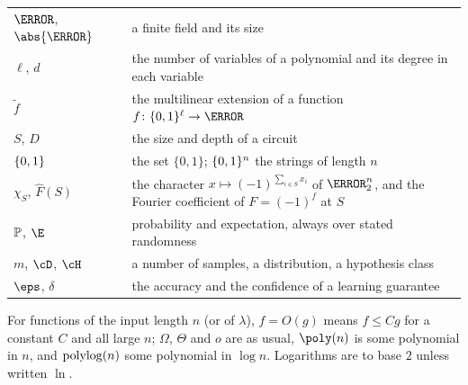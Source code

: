 \begin{tabular}{@{}p{}p{}@{}}
$\F$, $\abs{\F}$ & a finite field and its size \\
$\ell$, $d$ & the number of variables of a polynomial and its degree in each variable \\
$\tilde f$ & the multilinear extension of a function $f\colon\bits^\ell\to\F$ \\
$S$, $D$ & the size and depth of a circuit \\
$\{0,1\}$ & the set $\{0,1\}$; $\{0,1\}^n$ the strings of length $n$ \\
$\chi_S$, $\hat F(S)$ & the character $x\mapsto(-1)^{\sum_{i\in S}x_i}$ of $\F_2^n$, and the Fourier coefficient of $F=(-1)^f$ at $S$ \\
$\mathbb{P}$, $\E$ & probability and expectation, always over stated randomness \\
$m$, $\cD$, $\cH$ & a number of samples, a distribution, a hypothesis class \\
$\eps$, $\delta$ & the accuracy and the confidence of a learning guarantee
\end{tabular}


For functions of the input length $n$ (or of $\lambda$), $f=O(g)$ means $f\le Cg$ for a constant $C$ and all large $n$; $\Omega$, $\Theta$ and $o$ are as usual, $\poly(n)$ is some polynomial in $n$, and $\operatorname{polylog}(n)$ some polynomial in $\log n$. Logarithms are to base $2$ unless written $\ln$.
